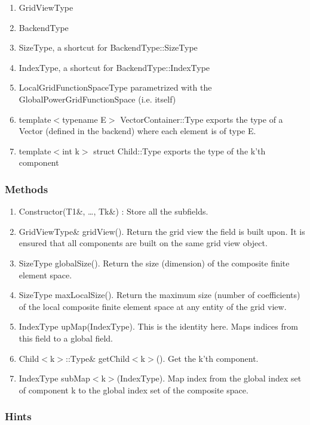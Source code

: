 \documentclass[11pt,a4paper,DIV11,%
notitlepage,oneside,abstracton,%
bibtotoc]{scrartcl}
\begin{document}
\begin{enumerate}[1)]
\item GridViewType 
\item BackendType
\item SizeType, a shortcut for BackendType::SizeType
\item IndexType, a shortcut for BackendType::IndexType
\item LocalGridFunctionSpaceType parametrized with the GlobalPowerGridFunctionSpace (i.e. itself)
\item template$<$typename E$>$ VectorContainer::Type exports the type of a Vector
  (defined in the backend) where each element is of type E.
\item template$<$int k$>$ struct Child::Type exports the type of
  the k'th component
\end{enumerate}

\subsubsection{Methods}

\begin{enumerate}[1)]
\item Constructor(T1\&, \ldots , Tk\&) : Store all the subfields.
\item GridViewType\& gridView(). Return the grid view 
  the field is built upon. It is ensured that all components are built
  on the same grid view object.
\item SizeType globalSize(). Return the size (dimension) of the
  composite finite element space.  
\item SizeType maxLocalSize(). Return the maximum size (number of
  coefficients) of the local composite finite element space at any entity of the
  grid view.
\item IndexType upMap(IndexType). This is the identity here. Maps
  indices from this field to a global field.
\item Child$<$k$>$::Type\& getChild$<$k$>$(). Get the k'th component.
\item IndexType subMap$<$k$>$(IndexType). Map index from the global
  index set of component k to the global index set of the composite space.
\end{enumerate}

\subsubsection{Hints}
\end{document}

